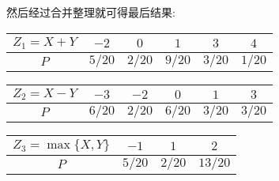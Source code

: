 \begin{example}
\begin{solution}
   		然后经过合并整理就可得最后结果:
   		\begin{center}
   			\begin{tabular}{c|ccccc}
   				\hline
   				$Z_1=X+Y$ & $-2$ & $0$ & $1$ & $3$ & $4$\\
   				\hline
   				$P$ & $5/20$ & $2/20$ & $9/20$ & $3/20$ & $1/20$\\
   				\hline
   			\end{tabular}
   		\end{center}
   	    \begin{center}
   	    	\begin{tabular}{c|ccccc}
   	    		\hline
   	    		$Z_2=X-Y$ & $-3$ & $-2$ & $0$ & $1$ & $3$\\
   	    		\hline
   	    		$P$ & $6/20$ & $2/20$ & $6/20$ & $3/20$ & $3/20$\\
   	    		\hline
   	    	\end{tabular}
   	    \end{center}
       \begin{center}
       	\begin{tabular}{c|ccc}
       		\hline
       		$Z_3=\max\{X,Y\}$ & $-1$ & $1$ & $2$\\
       		\hline
       		$P$ & $5/20$ &  $2/20$ & $13/20$\\
       		\hline
       	\end{tabular}
       \end{center}
   	\end{solution}
   \end{example}

